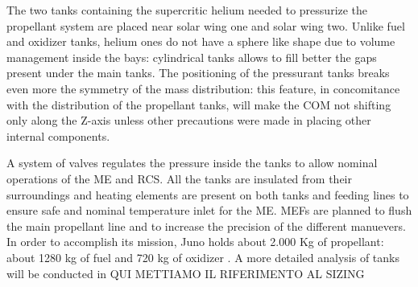 The two tanks\cite{2tankshe} containing the supercritic helium needed to pressurize the propellant system are placed near solar wing one and solar wing two. Unlike fuel and oxidizer tanks, helium ones do not have a sphere like shape due to volume management inside the bays\cite{he_tank}: cylindrical tanks allows to fill better the gaps present under the main tanks. The positioning of the pressurant tanks breaks even more the symmetry of the mass distribution: this feature, in concomitance with the distribution of the propellant tanks, will make the COM not shifting only along the Z-axis unless other precautions were made in placing other internal components. 

A system of valves regulates the pressure inside the tanks to allow nominal operations of the ME and RCS. All the tanks are insulated from their surroundings and heating elements are present on both tanks and feeding lines to ensure safe and nominal temperature inlet for the ME\cite{Leros}. MEFs are planned to flush the main propellant line and to increase the precision of the different manuevers. 
In order to accomplish its mission, Juno holds about 2.000 Kg of propellant: about 1280 kg of fuel and 720 kg of oxidizer \cite{junno_inner}. A more detailed analysis of tanks will be conducted in QUI METTIAMO IL RIFERIMENTO AL SIZING
 











